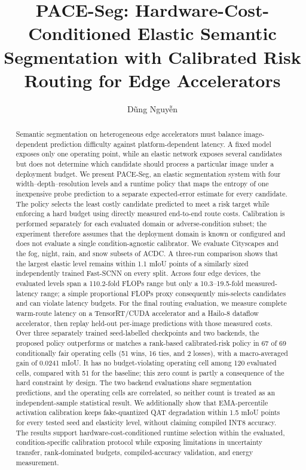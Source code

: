 \documentclass[a4paper,review,12pt]{elsarticle}
\newcommand{\method}{PACE-Seg}
\newcommand{\miou}{mIoU}
\begin{document}
\begin{frontmatter}

\title{PACE-Seg: Hardware-Cost-Conditioned Elastic Semantic Segmentation with Calibrated Risk Routing for Edge Accelerators}

\author{Dũng Nguyễn}

\begin{abstract}
Semantic segmentation on heterogeneous edge accelerators must balance image-dependent prediction difficulty against platform-dependent latency. A fixed model exposes only one operating point, while an elastic network exposes several candidates but does not determine which candidate should process a particular image under a deployment budget. We present \method, an elastic segmentation system with four width--depth--resolution levels and a runtime policy that maps the entropy of one inexpensive probe prediction to a separate expected-error estimate for every candidate. The policy selects the least costly candidate predicted to meet a risk target while enforcing a hard budget using directly measured end-to-end route costs. Calibration is performed separately for each evaluated domain or adverse-condition subset; the experiment therefore assumes that the deployment domain is known or configured and does not evaluate a single condition-agnostic calibrator. We evaluate Cityscapes and the fog, night, rain, and snow subsets of ACDC. A three-run comparison shows that the largest elastic level remains within 1.1 \miou{} points of a similarly sized independently trained Fast-SCNN on every split. Across four edge devices, the evaluated levels span a 110.2-fold FLOPs range but only a 10.3--19.5-fold measured-latency range; a simple proportional FLOPs proxy consequently mis-selects candidates and can violate latency budgets. For the final routing evaluation, we measure complete warm-route latency on a TensorRT/CUDA accelerator and a Hailo-8 dataflow accelerator, then replay held-out per-image predictions with those measured costs. Over three separately trained seed-labelled checkpoints and two backends, the proposed policy outperforms or matches a rank-based calibrated-risk policy in 67 of 69 conditionally fair operating cells (51 wins, 16 ties, and 2 losses), with a macro-averaged gain of 0.0241 \miou{}. It has no budget-violating operating cell among 120 evaluated cells, compared with 51 for the baseline; this zero count is partly a consequence of the hard constraint by design. The two backend evaluations share segmentation predictions, and the operating cells are correlated, so neither count is treated as an independent-sample statistical result. We additionally show that EMA-percentile activation calibration keeps fake-quantized QAT degradation within 1.5 \miou{} points for every tested seed and elasticity level, without claiming compiled INT8 accuracy. The results support hardware-cost-conditioned runtime selection within the evaluated, condition-specific calibration protocol while exposing limitations in uncertainty transfer, rank-dominated budgets, compiled-accuracy validation, and energy measurement.
\end{abstract}


\end{frontmatter}
\end{document}

